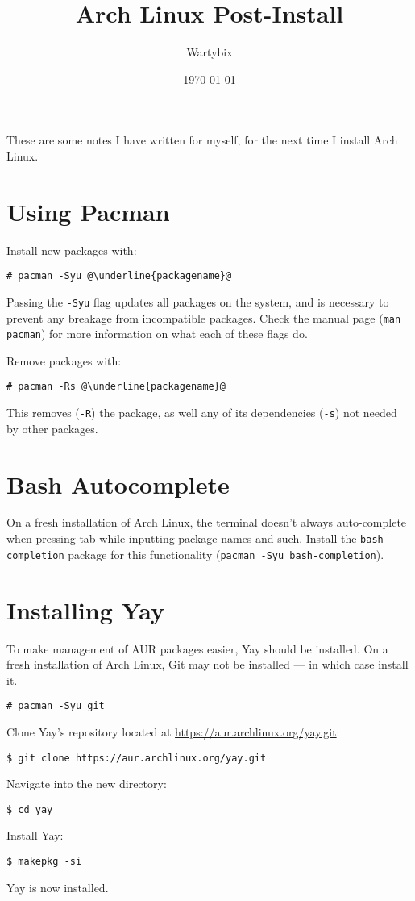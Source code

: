 \documentclass[a4paper]{article}
\title{Arch Linux Post-Install}
\author{Wartybix}
\date{\today}
\begin{document}
\maketitle

These are some notes I have written for myself, for the next time I install Arch Linux.

\section{Using Pacman}

Install new packages with:
\begin{lstlisting}[escapechar=@]
# pacman -Syu @\underline{packagename}@
\end{lstlisting}
Passing the \lstinline|-Syu| flag updates all packages on the system, and is necessary to prevent any breakage from incompatible packages.
Check the manual page (\lstinline|man pacman|) for more information on what each of these 
flags do.

Remove packages with:
\begin{lstlisting}[escapechar=@]
# pacman -Rs @\underline{packagename}@
\end{lstlisting}
This removes (\lstinline|-R|) the package, as well any of its dependencies (\lstinline|-s|) not needed by other packages.

\section{Bash Autocomplete}

On a fresh installation of Arch Linux, the terminal doesn't always auto-complete when pressing tab while inputting package names and such.
Install the \lstinline|bash-completion| package for this functionality (\lstinline|pacman -Syu bash-completion|).

\section{Installing Yay}

To make management of AUR packages easier, Yay should be installed.
On a fresh installation of Arch Linux, Git may not be installed --- in which case install it.
\begin{lstlisting}
# pacman -Syu git
\end{lstlisting}
Clone Yay's repository located at \url{https://aur.archlinux.org/yay.git}:
\begin{lstlisting}
$ git clone https://aur.archlinux.org/yay.git
\end{lstlisting}
Navigate into the new directory:
\begin{lstlisting}
$ cd yay
\end{lstlisting}
Install Yay:
\begin{lstlisting}
$ makepkg -si
\end{lstlisting}
Yay is now installed.
\end{document}
